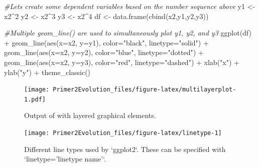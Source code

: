 \documentclass[
]{book}
\newenvironment{Shaded}{\begin{snugshade}}{\end{snugshade}}
\newcommand{\AttributeTok}[1]{\textcolor[rgb]{0.77,0.63,0.00}{#1}}
\newcommand{\CommentTok}[1]{\textcolor[rgb]{0.56,0.35,0.01}{\textit{#1}}}
\newcommand{\DecValTok}[1]{\textcolor[rgb]{0.00,0.00,0.81}{#1}}
\newcommand{\FunctionTok}[1]{\textcolor[rgb]{0.00,0.00,0.00}{#1}}
\newcommand{\NormalTok}[1]{#1}
\newcommand{\OtherTok}[1]{\textcolor[rgb]{0.56,0.35,0.01}{#1}}
\newcommand{\SpecialCharTok}[1]{\textcolor[rgb]{0.00,0.00,0.00}{#1}}
\newcommand{\StringTok}[1]{\textcolor[rgb]{0.31,0.60,0.02}{#1}}
\begin{document}
\begin{Shaded}
\begin{Highlighting}[]
\CommentTok{\#Let\textquotesingle{}s create some dependent variables based on the number sequence above}
\NormalTok{y1 }\OtherTok{\textless{}{-}}\NormalTok{ x2}\SpecialCharTok{\^{}}\DecValTok{2}
\NormalTok{y2 }\OtherTok{\textless{}{-}}\NormalTok{ x2}\SpecialCharTok{\^{}}\DecValTok{3}
\NormalTok{y3 }\OtherTok{\textless{}{-}}\NormalTok{ x2}\SpecialCharTok{\^{}}\DecValTok{4}
\NormalTok{df }\OtherTok{\textless{}{-}} \FunctionTok{data.frame}\NormalTok{(}\FunctionTok{cbind}\NormalTok{(x2,y1,y2,y3))}

\CommentTok{\#Multiple geom\_line() are used to simultaneously plot y1, y2, and y3}
\FunctionTok{ggplot}\NormalTok{(df) }\SpecialCharTok{+}
    \FunctionTok{geom\_line}\NormalTok{(}\FunctionTok{aes}\NormalTok{(}\AttributeTok{x=}\NormalTok{x2, }\AttributeTok{y=}\NormalTok{y1), }\AttributeTok{color=}\StringTok{"black"}\NormalTok{, }\AttributeTok{linetype=}\StringTok{"solid"}\NormalTok{) }\SpecialCharTok{+}
    \FunctionTok{geom\_line}\NormalTok{(}\FunctionTok{aes}\NormalTok{(}\AttributeTok{x=}\NormalTok{x2, }\AttributeTok{y=}\NormalTok{y2), }\AttributeTok{color=}\StringTok{"blue"}\NormalTok{, }\AttributeTok{linetype=}\StringTok{"dotted"}\NormalTok{) }\SpecialCharTok{+}
    \FunctionTok{geom\_line}\NormalTok{(}\FunctionTok{aes}\NormalTok{(}\AttributeTok{x=}\NormalTok{x2, }\AttributeTok{y=}\NormalTok{y3), }\AttributeTok{color=}\StringTok{"red"}\NormalTok{, }\AttributeTok{linetype=}\StringTok{"dashed"}\NormalTok{) }\SpecialCharTok{+}
    \FunctionTok{xlab}\NormalTok{(}\StringTok{"x"}\NormalTok{) }\SpecialCharTok{+}
    \FunctionTok{ylab}\NormalTok{(}\StringTok{"y"}\NormalTok{) }\SpecialCharTok{+}
    \FunctionTok{theme\_classic}\NormalTok{()}
\end{Highlighting}
\end{Shaded}

\begin{figure}
\centering
\texttt{[image: Primer2Evolution\_files/figure-latex/multilayerplot-1.pdf]}
\caption{\label{fig:multilayerplot}Output of with layered graphical elements.}
\end{figure}

\begin{figure}
\texttt{[image: Primer2Evolution\_files/figure-latex/linetype-1]} \caption{Different line types used by `ggplot2`. These can be specified with `linetype='linetype name'`.}\label{fig:linetype}
\end{figure}
\end{document}
